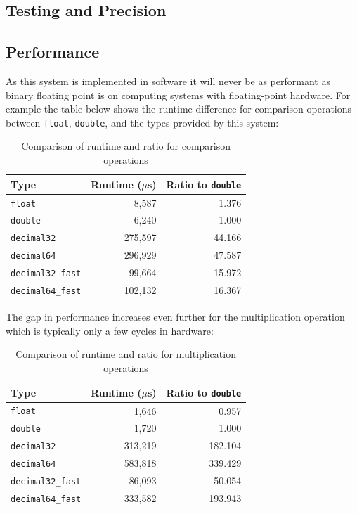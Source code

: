 \documentclass[acmsmall]{acmart}
\newcommand{\code}[1]{\texttt{#1}}
\begin{document}
\subsection{Testing and Precision}
\subsection{Performance}

As this system is implemented in software it will never be as performant as binary floating point is on computing systems with floating-point hardware.
For example the table below shows the runtime difference for comparison operations between \code{float}, \code{double}, and the types provided by this system:

\begin{table}[h]
\centering
\begin{tabular}{|l|r|r|}
\hline
Type & Runtime ($\mu$s) & Ratio to \texttt{double} \\
\hline
\texttt{float} & 8,587 & 1.376 \\
\texttt{double} & 6,240 & 1.000 \\
\texttt{decimal32} & 275,597 & 44.166 \\
\texttt{decimal64} & 296,929 & 47.587 \\
\texttt{decimal32\_fast} & 99,664 & 15.972 \\
\texttt{decimal64\_fast} & 102,132 & 16.367 \\
\hline
\end{tabular}
\caption{Comparison of runtime and ratio for comparison operations}
\label{tab:comp-comparison}
\end{table}

The gap in performance increases even further for the multiplication operation which is typically only a few cycles in hardware\cite{arm_trm}:

\begin{table}[h]
\centering
\begin{tabular}{|l|r|r|}
\hline
Type & Runtime ($\mu$s) & Ratio to \texttt{double} \\
\hline
\texttt{float} & 1,646 & 0.957 \\
\texttt{double} & 1,720 & 1.000 \\
\texttt{decimal32} & 313,219 & 182.104 \\
\texttt{decimal64} & 583,818 & 339.429 \\
\texttt{decimal32\_fast} & 86,093 & 50.054 \\
\texttt{decimal64\_fast} & 333,582 & 193.943 \\
\hline
\end{tabular}
\caption{Comparison of runtime and ratio for multiplication operations}
\label{tab:mul-comparison}
\end{table}
\end{document}
